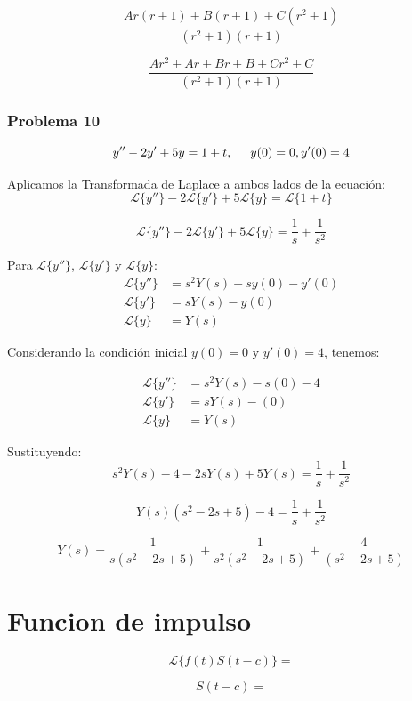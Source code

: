\documentclass{article}
\begin{document}
\[
    \frac{Ar(r+1) + B(r+1) + C(r^2 + 1)}{(r^2 + 1)(r + 1)}
\]

\[
    \frac{Ar^2 + Ar + Br + B + Cr^2 + C}{(r^2 + 1)(r + 1)}
\]

\newpage


\subsubsection{Problema 10}
\[y'' - 2y' + 5y = 1 + t, \hspace{.5cm} y(0) = 0, y'(0) = 4\]

Aplicamos la Transformada de Laplace a ambos lados de la ecuación:
\[
    \mathcal{L}\{y''\} - 2\mathcal{L}\{y'\} + 5\mathcal{L}\{y\} = \mathcal{L}\{1 + t\}
\]

\[
    \mathcal{L}\{y''\} - 2\mathcal{L}\{y'\} + 5\mathcal{L}\{y\} = \frac{1}{s} + \frac{1}{s^2}
\]

Para \(\mathcal{L}\{y''\}\), \(\mathcal{L}\{y'\}\) y \(\mathcal{L}\{y\}\):
\begin{align*}
    \mathcal{L}\{y''\} & = s^2Y(s) - sy(0) - y'(0) \\
    \mathcal{L}\{y'\}  & = sY(s) - y(0)            \\
    \mathcal{L}\{y\}   & = Y(s)
\end{align*}

Considerando la condición inicial $y(0) = 0$ y $y'(0) = 4$, tenemos:

\begin{align*}
    \mathcal{L}\{y''\} & = s^2Y(s) - s(0) - 4 \\
    \mathcal{L}\{y'\}  & = sY(s) - (0)        \\
    \mathcal{L}\{y\}   & = Y(s)
\end{align*}

Sustituyendo:
\[
    s^2Y(s) - 4 - 2sY(s) + 5Y(s) = \frac{1}{s} + \frac{1}{s^2}
\]

\[
    Y(s)(s^2 - 2s + 5) - 4 = \frac{1}{s} + \frac{1}{s^2}
\]


\[
    Y(s) = \frac{1}{s(s^2 - 2s + 5)} + \frac{1}{s^2(s^2 - 2s + 5)} + \frac{4}{(s^2 - 2s + 5)}
\]

\newpage


\section{Funcion de impulso}

\[
    \mathcal{L}\{f(t) S(t-c)\} =
\]

\[
    S(t-c) =
\]
\end{document}
